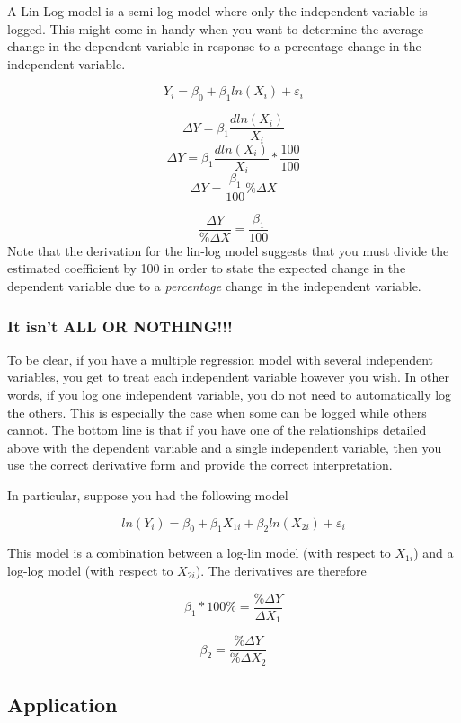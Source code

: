 \documentclass[
]{book}
\begin{document}
A Lin-Log model is a semi-log model where only the independent variable is logged. This might come in handy when you want to determine the average change in the dependent variable in response to a percentage-change in the independent variable.

\[Y_i=\beta_0 + \beta_1 ln(X_i) + \varepsilon_i\]

\[\Delta Y=\beta_1 \frac{dln(X_i)}{X_i}\]
\[\Delta Y=\beta_1 \frac{dln(X_i)}{X_i}*\frac{100}{100}\]
\[\Delta Y=\frac{\beta_1}{100} \%\Delta X\]

\[\frac{\Delta Y}{\%\Delta X}=\frac{\beta_1}{100} \]
Note that the derivation for the lin-log model suggests that you must divide the estimated coefficient by 100 in order to state the expected change in the dependent variable due to a \emph{percentage} change in the independent variable.

\hypertarget{it-isnt-all-or-nothing}{%
\subsubsection*{It isn't ALL OR NOTHING!!!}\label{it-isnt-all-or-nothing}}

To be clear, if you have a multiple regression model with several independent variables, you get to treat each independent variable however you wish. In other words, if you log one independent variable, you do not need to automatically log the others. This is especially the case when some can be logged while others cannot. The bottom line is that if you have one of the relationships detailed above with the dependent variable and a single independent variable, then you use the correct derivative form and provide the correct interpretation.

In particular, suppose you had the following model

\[ln(Y_i)=\beta_0 + \beta_1 X_{1i} + \beta_2 ln(X_{2i}) + \varepsilon_i\]

This model is a combination between a log-lin model (with respect to \(X_{1i}\)) and a log-log model (with respect to \(X_{2i}\)). The derivatives are therefore

\[\beta_1 * 100\% = \frac{\% \Delta Y}{\Delta X_1}\]

\[\beta_2= \frac{\% \Delta Y}{\%\Delta X_2}\]

\hypertarget{application}{%
\subsection*{Application}\label{application}}
\end{document}
